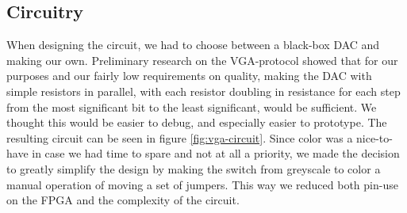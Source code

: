 \subsection{Circuitry}
 When designing the circuit, we had to choose between
a black-box \ac{DAC} and making our
own. Preliminary research on the \ac{VGA}-protocol showed that for our purposes
and our fairly low requirements on quality, making the \ac{DAC} with simple
resistors in parallel, with each resistor doubling in resistance for each step
from the most significant bit to the least significant, would be sufficient. We
thought this would be easier to debug, and especially easier to prototype. The
resulting circuit can be seen in figure \ref{fig:vga-circuit}. Since color was a
nice-to-have in case we had time to spare and not at all a priority, we made the
decision to greatly simplify the design by making the switch from greyscale to
color a manual operation of moving a set of jumpers. This way we reduced both
pin-use on the \ac{FPGA} and the complexity of the circuit.
